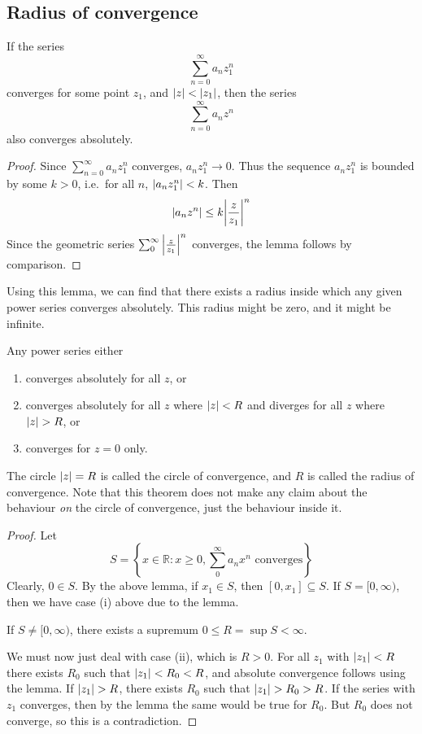 \subsection{Radius of convergence}
\begin{lemma}
	If the series
	\[
		\sum_{n=0}^\infty a_n z_1^n
	\]
	converges for some point \(z_1\), and \(\abs{z} < \abs{z_1}\), then the series
	\[
		\sum_{n=0}^\infty a_n z^n
	\]
	also converges absolutely.
\end{lemma}
\begin{proof}
	Since \(\sum_{n=0}^\infty a_n z_1^n\) converges, \(a_n z_1^n \to 0\).
	Thus the sequence \(a_n z_1^n\) is bounded by some \(k > 0\), i.e.\ for all \(n\), \(\abs{a_n z_1^n}<k\).
	Then
	\[
		\abs{a_n z^n} \leq k\abs{\frac{z}{z_1}}^n
	\]
	Since the geometric series \(\sum_0^\infty \abs{\frac{z}{z_1}}^n\) converges, the lemma follows by comparison.
\end{proof}
\noindent Using this lemma, we can find that there exists a radius inside which any given power series converges absolutely.
This radius might be zero, and it might be infinite.
\begin{theorem}
	Any power series either
	\begin{enumerate}
		\item converges absolutely for all \(z\), or
		\item converges absolutely for all \(z\) where \(\abs{z} < R\) and diverges for all \(z\) where \(\abs{z} > R\), or
		\item converges for \(z = 0\) only.
	\end{enumerate}
\end{theorem}
\noindent The circle \(\abs{z} = R\) is called the circle of convergence, and \(R\) is called the radius of convergence.
Note that this theorem does not make any claim about the behaviour \textit{on} the circle of convergence, just the behaviour inside it.
\begin{proof}
	Let
	\[
		S = \left\{ x \in \mathbb R \colon x \geq 0, \sum_0^\infty a_n x^n \text{ converges} \right\}
	\]
	Clearly, \(0 \in S\).
	By the above lemma, if \(x_1 \in S\), then \([0, x_1] \subseteq S\).
	If \(S = [0, \infty)\), then we have case (i) above due to the lemma.

	If \(S \neq [0, \infty)\), there exists a supremum \(0 \leq R = \sup S < \infty\).

	We must now just deal with case (ii), which is \(R > 0\).
	For all \(z_1\) with \(\abs{z_1} < R\) there exists \(R_0\) such that \(\abs{z_1} < R_0 < R\), and absolute convergence follows using the lemma.
	If \(\abs{z_1} > R\), there exists \(R_0\) such that \(\abs{z_1} > R_0 > R\).
	If the series with \(z_1\) converges, then by the lemma the same would be true for \(R_0\).
	But \(R_0\) does not converge, so this is a contradiction.
\end{proof}

